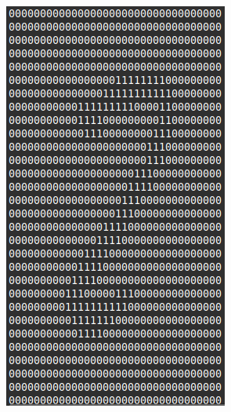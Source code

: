 \begin{figure}[htbp]
\begin{subfigure}[b]{0.2\linewidth}
		\includegraphics[width=1\linewidth]{pics/wrong_output_predict2_2.png}
		\label{fig:sub3}
	\end{subfigure}
	

\end{figure}
